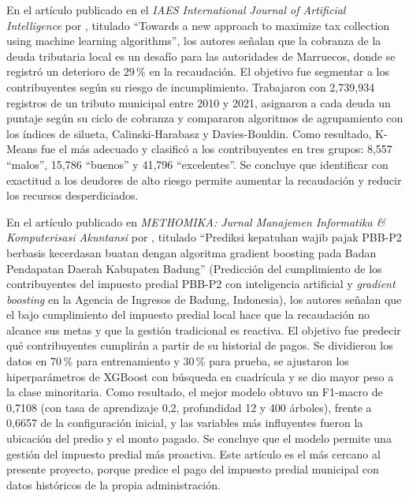\documentclass[12pt,a4paper]{report}
\begin{document}
En el artículo publicado en el \textit{IAES International Journal of Artificial Intelligence} por \textcite{ourdani2024}, titulado ``Towards a new approach to maximize tax collection using machine learning algorithms'', los autores señalan que la cobranza de la deuda tributaria local es un desafío para las autoridades de Marruecos, donde se registró un deterioro de 29\,\% en la recaudación. El objetivo fue segmentar a los contribuyentes según su riesgo de incumplimiento. Trabajaron con 2,739,934 registros de un tributo municipal entre 2010 y 2021, asignaron a cada deuda un puntaje según su ciclo de cobranza y compararon algoritmos de agrupamiento con los índices de silueta, Calinski-Harabasz y Davies-Bouldin. Como resultado, K-Means fue el más adecuado y clasificó a los contribuyentes en tres grupos: 8,557 ``malos'', 15,786 ``buenos'' y 41,796 ``excelentes''. Se concluye que identificar con exactitud a los deudores de alto riesgo permite aumentar la recaudación y reducir los recursos desperdiciados.

En el artículo publicado en \textit{METHOMIKA: Jurnal Manajemen Informatika \& Komputerisasi Akuntansi} por \textcite{sugiana2026}, titulado ``Prediksi kepatuhan wajib pajak PBB-P2 berbasis kecerdasan buatan dengan algoritma gradient boosting pada Badan Pendapatan Daerah Kabupaten Badung'' (Predicción del cumplimiento de los contribuyentes del impuesto predial PBB-P2 con inteligencia artificial y \textit{gradient boosting} en la Agencia de Ingresos de Badung, Indonesia), los autores señalan que el bajo cumplimiento del impuesto predial local hace que la recaudación no alcance sus metas y que la gestión tradicional es reactiva. El objetivo fue predecir qué contribuyentes cumplirán a partir de su historial de pagos. Se dividieron los datos en 70\,\% para entrenamiento y 30\,\% para prueba, se ajustaron los hiperparámetros de XGBoost con búsqueda en cuadrícula y se dio mayor peso a la clase minoritaria. Como resultado, el mejor modelo obtuvo un F1-macro de 0,7108 (con tasa de aprendizaje 0,2, profundidad 12 y 400 árboles), frente a 0,6657 de la configuración inicial, y las variables más influyentes fueron la ubicación del predio y el monto pagado. Se concluye que el modelo permite una gestión del impuesto predial más proactiva. Este artículo es el más cercano al presente proyecto, porque predice el pago del impuesto predial municipal con datos históricos de la propia administración.
\end{document}
